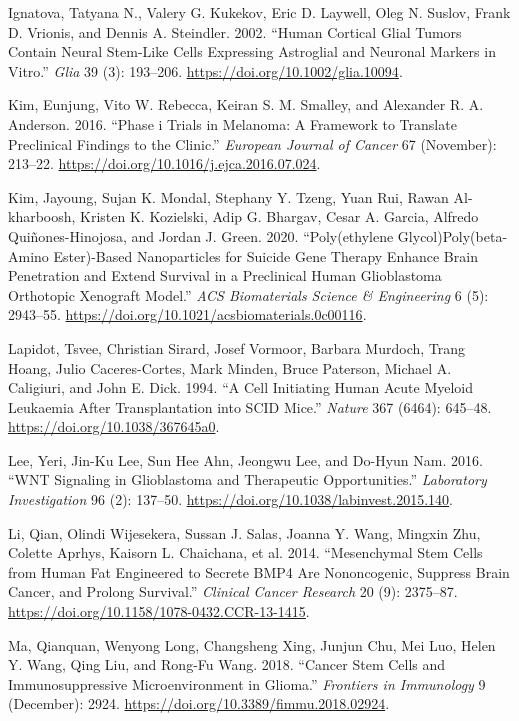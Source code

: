 \documentclass[
  default,
]{sn-jnl}
\newlength{\cslhangindent}
\newenvironment{CSLReferences}[2] %
 {\begin{list}{}{%
  \setlength{\itemindent}{0pt}
  \setlength{\leftmargin}{0pt}
  \setlength{\parsep}{0pt}
  \ifodd #1
   \setlength{\leftmargin}{\cslhangindent}
   \setlength{\itemindent}{-1\cslhangindent}
  \fi
  \setlength{\itemsep}{#2\baselineskip}}}
 {\end{list}}
\begin{document}
\begin{CSLReferences}{1}{0}
Ignatova, Tatyana N., Valery G. Kukekov, Eric D. Laywell, Oleg N.
Suslov, Frank D. Vrionis, and Dennis A. Steindler. 2002. {``Human
Cortical Glial Tumors Contain Neural Stem{-}Like Cells Expressing
Astroglial and Neuronal Markers in Vitro.''} \emph{Glia} 39 (3):
193--206. \url{https://doi.org/10.1002/glia.10094}.

Kim, Eunjung, Vito W. Rebecca, Keiran S. M. Smalley, and Alexander R. A.
Anderson. 2016. {``Phase i Trials in Melanoma: A Framework to Translate
Preclinical Findings to the Clinic.''} \emph{European Journal of Cancer}
67 (November): 213--22.
\url{https://doi.org/10.1016/j.ejca.2016.07.024}.

Kim, Jayoung, Sujan K. Mondal, Stephany Y. Tzeng, Yuan Rui, Rawan
Al-kharboosh, Kristen K. Kozielski, Adip G. Bhargav, Cesar A. Garcia,
Alfredo Quiñones-Hinojosa, and Jordan J. Green. 2020. {``Poly(ethylene
Glycol){\textendash}Poly(beta-Amino Ester)-Based Nanoparticles for
Suicide Gene Therapy Enhance Brain Penetration and Extend Survival in a
Preclinical Human Glioblastoma Orthotopic Xenograft Model.''} \emph{ACS
Biomaterials Science \& Engineering} 6 (5): 2943--55.
\url{https://doi.org/10.1021/acsbiomaterials.0c00116}.

Lapidot, Tsvee, Christian Sirard, Josef Vormoor, Barbara Murdoch, Trang
Hoang, Julio Caceres-Cortes, Mark Minden, Bruce Paterson, Michael A.
Caligiuri, and John E. Dick. 1994. {``A Cell Initiating Human Acute
Myeloid Leukaemia After Transplantation into SCID Mice.''} \emph{Nature}
367 (6464): 645--48. \url{https://doi.org/10.1038/367645a0}.

Lee, Yeri, Jin-Ku Lee, Sun Hee Ahn, Jeongwu Lee, and Do-Hyun Nam. 2016.
{``WNT Signaling in Glioblastoma and Therapeutic Opportunities.''}
\emph{Laboratory Investigation} 96 (2): 137--50.
\url{https://doi.org/10.1038/labinvest.2015.140}.

Li, Qian, Olindi Wijesekera, Sussan J. Salas, Joanna Y. Wang, Mingxin
Zhu, Colette Aprhys, Kaisorn L. Chaichana, et al. 2014. {``Mesenchymal
Stem Cells from Human Fat Engineered to Secrete BMP4 Are Nononcogenic,
Suppress Brain Cancer, and Prolong Survival.''} \emph{Clinical Cancer
Research} 20 (9): 2375--87.
\url{https://doi.org/10.1158/1078-0432.CCR-13-1415}.

Ma, Qianquan, Wenyong Long, Changsheng Xing, Junjun Chu, Mei Luo, Helen
Y. Wang, Qing Liu, and Rong-Fu Wang. 2018. {``Cancer Stem Cells and
Immunosuppressive Microenvironment in Glioma.''} \emph{Frontiers in
Immunology} 9 (December): 2924.
\url{https://doi.org/10.3389/fimmu.2018.02924}.


\end{CSLReferences}
\end{document}
